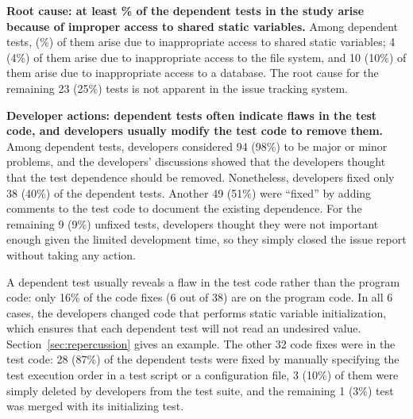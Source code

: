 

\vspace{1mm}
\noindent \textbf{{Root cause: at least \svratio\% of the dependent tests
in the study arise because of improper access to shared static
variables.}} Among \dtnum dependent tests, \svnum (\svratio\%) of them
arise due to inappropriate access to
shared static variables; 4 (4\%) of them arise
due to inappropriate access to the file system, and 10 (10\%) of them arise
due to inappropriate access to a database.
The root cause for the remaining 23 (25\%) tests is not apparent
in the issue tracking system.

\vspace{1mm}
\noindent \textbf{{Developer actions: dependent tests
often indicate flaws in the test code, and developers usually
modify the test code to remove them.}}
Among \dtnum dependent tests, developers considered 
94 (98\%) to be major or minor problems, and the 
developers' discussions showed that the developers thought that the test
dependence should be removed.
Nonetheless, developers fixed only 38 (40\%) of the \dtnum dependent tests.
Another 49 (51\%) were ``fixed'' 
by adding comments to the test code to document the existing dependence.
For the remaining 9 (9\%) unfixed tests,
developers thought they were not important enough given the limited
development time, so they simply closed the issue report without taking
any action.


A dependent test usually
reveals a flaw in the test code rather than the program code:
only 16\% of the code fixes (6 out of 38) are
on the program code.
In all 6 cases, the developers changed
code that performs static variable initialization, which ensures that
each dependent test will not read an undesired value.
Section~\ref{sec:repercussion} gives an example.
The other 32 code fixes were in the test code:
28 (87\%) of the dependent tests were fixed by manually specifying
the test execution order in a test script or a configuration file,
3 (10\%) of them were simply deleted by developers
from the test suite, and the remaining 1 (3\%) test was merged with its
initializing test.


